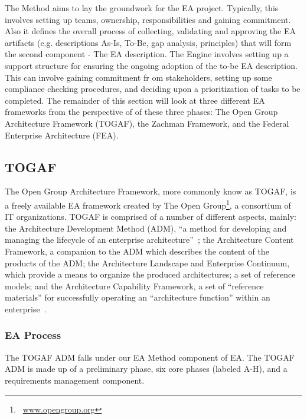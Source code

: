 The Method aims to lay the groundwork for the EA project. Typically, this involves setting up teams, ownership, responsibilities and gaining commitment. Also it defines the overall process of collecting, validating and approving the EA artifacts  (e.g. descriptions As-Is, To-Be, gap analysis,  principles) that will form the second component - The EA description.  The Engine involves setting up a support structure for ensuring the ongoing adoption of the to-be EA description. This can involve gaining commitment fr  om stakeholders, setting up some compliance checking procedures, and deciding upon a prioritization of tasks to be completed. The remainder of this section will look at three different EA frameworks from the perspective of of these three phases: The Open Group Architecture Framework (TOGAF), the Zachman Framework, and the Federal Enterprise Architecture (FEA).


\subsection{TOGAF}
The Open Group Architecture Framework, more commonly know as TOGAF, is a freely available EA framework created by The Open Group\footnote{~\url{www.opengroup.org}}, a consortium of IT organizations. TOGAF is comprised of a number of different aspects, mainly: the Architecture Development Method (ADM), ``a method for developing and managing the lifecycle of an enterprise architecture''~\cite[Ch. 5.1]{togaf9.1}; the Architecture Content Framework, a companion to the ADM which describes the content of the products of the ADM; the Architecture Landscape and Enterprise Continuum, which provide a means to organize the produced architectures; a set of reference models; and the Architecture Capability Framework, a set of ``reference materials'' for successfully operating an ``architecture function'' within an enterprise~\cite[Ch. 45]{togaf9.1}. 

%
%


\subsubsection{EA Process}
The TOGAF ADM falls under our EA Method component of EA. The TOGAF ADM is made up of a preliminary phase, six core phases (labeled A-H), and a requirements management component. 

